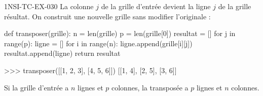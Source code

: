 \begin{corrige}{1NSI-TC-EX-030}
La colonne $j$ de la grille d'entrée devient la ligne $j$ de la grille résultat. On construit une nouvelle grille sans modifier l'originale :

\begin{python}
def transposer(grille):
    n = len(grille)
    p = len(grille[0])
    resultat = []
    for j in range(p):
        ligne = []
        for i in range(n):
            ligne.append(grille[i][j])
        resultat.append(ligne)
    return resultat
\end{python}

\begin{console}
>>> transposer([[1, 2, 3], [4, 5, 6]])
[[1, 4], [2, 5], [3, 6]]
\end{console}

Si la grille d'entrée a $n$ lignes et $p$ colonnes, la transposée a $p$ lignes et $n$ colonnes.
\end{corrige}
